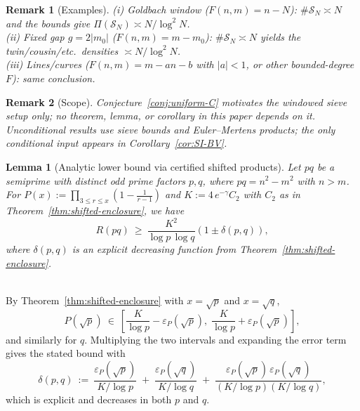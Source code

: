 \documentclass[11pt]{article}
\makeatletter
\theoremstyle{inline}
\newtheorem*{remark}{Remark}
\theoremstyle{break}
\newtheorem{lemma}{Lemma}
\renewenvironment{proof}[1][\proofname]{%
  \par\pushQED{\qed}%
  \normalfont \topsep6\p@\@plus6\p@\relax
  \trivlist
  \item[\hskip\labelsep
        \itshape
    #1\@addpunct{.}]\mbox{}\\  %
}{%
  \popQED\endtrivlist\@endpefalse
}
\theoremstyle{break}
\theoremstyle{break}
\theoremstyle{break}
\theoremstyle{break}
\theoremstyle{break}
\theoremstyle{break}
\theoremstyle{inline}
\makeatother
\begin{document}
\begin{remark}[Examples]
(i) \emph{Goldbach window} (\( F(n,m)=n-N \)): \( \#\mathcal{S}_N\asymp N \) and the bounds give \( \Pi(\mathcal{S}_N)\asymp N/\log^2 N \).\\
(ii) \emph{Fixed gap} \( g=2|m_0| \) (\( F(n,m)=m-m_0 \)): \( \#\mathcal{S}_N\asymp N \) yields the twin/cousin/etc.\ densities \( \asymp N/\log^2 N \).\\
(iii) \emph{Lines/curves} (\( F(n,m)=m-an-b \) with \( |a|<1 \), or other bounded-degree \( F \)): same conclusion.
\end{remark}

\begin{remark}[Scope]
Conjecture~\ref{conj:uniform-C} motivates the windowed sieve setup only; no theorem, lemma, or corollary in this paper depends on it. Unconditional results use sieve bounds and Euler–Mertens products; the only conditional input appears in Corollary~\ref{cor:SI-BV}.
\end{remark}

\begin{lemma}[Analytic lower bound via certified shifted products]
\label{lem:analytic-lower-bound-reduction}
Let \( pq \) be a semiprime with distinct odd prime factors \( p,q \), where \( pq=n^2-m^2 \) with \( n>m \). 
For \( P(x):=\prod_{3\le r\le x}(1-\tfrac{1}{r-1}) \) and \( K:=4\,e^{-\gamma}C_2 \) with \( C_2 \) as in Theorem~\ref{thm:shifted-enclosure}, we have
\begin{equation}
R(pq)\ \ge\ \frac{K^2}{\log p\,\log q}
\left(1 \pm \delta(p,q)\right),
\end{equation}
where \( \delta(p,q) \) is an explicit decreasing function from Theorem~\ref{thm:shifted-enclosure}.
\end{lemma}

\begin{proof}
By Theorem~\ref{thm:shifted-enclosure} with \( x=\sqrt{p} \) and \( x=\sqrt{q} \),
\begin{equation}
P(\sqrt{p})\ \in\ \left[\frac{K}{\log p} - \varepsilon_P(\sqrt{p}),\; \frac{K}{\log p} + \varepsilon_P(\sqrt{p})\right],
\end{equation}
and similarly for \( q \). Multiplying the two intervals and expanding the error term gives the stated bound with
\begin{equation}
\delta(p,q)\ :=\ \frac{\varepsilon_P(\sqrt{p})}{K/\log p} \;+\; \frac{\varepsilon_P(\sqrt{q})}{K/\log q} \;+\; \frac{\varepsilon_P(\sqrt{p})\,\varepsilon_P(\sqrt{q})}{(K/\log p)(K/\log q)},
\end{equation}
which is explicit and decreases in both \( p \) and \( q \).
\end{proof}
\end{document}
